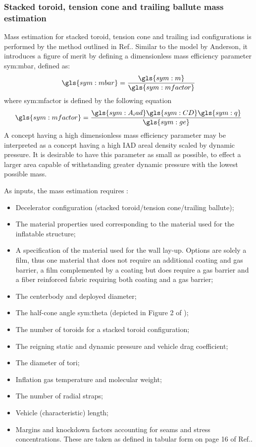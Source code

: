\subsubsection{Stacked toroid, tension cone and trailing ballute mass estimation}
Mass estimation for stacked toroid, tension cone and trailing \gls{iad} configurations is performed by the method outlined in Ref.\cite{Samareh2011}. Similar to the model by Anderson, it introduces a figure of merit by defining a dimensionless mass efficiency parameter \gls{sym:mbar}, defined as:
\begin{equation}
\gls{sym:mbar} = \frac{\gls{sym:m}}{\gls{sym:mfactor}}
\label{eq:dimmass}
\end{equation}
where \gls{sym:mfactor} is defined by the following equation
\begin{equation}
\gls{sym:mfactor} = \frac{\gls{sym:A_iad} \gls{sym:CD} \gls{sym:q}}{\gls{sym:ge}}
\label{eq:mfactor}
\end{equation}
A concept having a high dimensionless mass efficiency parameter may be interpreted as a concept having a high IAD areal density scaled by dynamic pressure. It is desirable to have this parameter as small as possible, to effect a larger area capable of withstanding greater dynamic pressure with the lowest possible mass.

As inputs, the mass estimation requires \cite{Samareh2011}:
\begin{itemize}
\item Decelerator configuration (stacked toroid/tension cone/trailing ballute);
\item The material properties used corresponding to the material used for the inflatable structure; 
\item A specification of the material used for the wall lay-up. Options are solely a film, thus one material that does not require an additional coating and gas barrier, a film complemented by a coating but does require a gas barrier and a fiber reinforced fabric requiring both coating and a gas barrier;
\item The centerbody and deployed diameter;
\item The half-cone angle \gls{sym:theta} (depicted in Figure 2 of \cite[p.7]{Samareh2011});
\item The number of toroids for a stacked toroid configuration;
\item The reigning static and dynamic pressure and vehicle drag coefficient;
\item The diameter of tori;
\item Inflation gas temperature and molecular weight;
\item The number of radial straps;
\item Vehicle (characteristic) length;
\item Margins and knockdown factors accounting for seams and stress concentrations. These are taken as defined in tabular form on page 16 of Ref.\cite{Samareh2011}.
\end{itemize}


